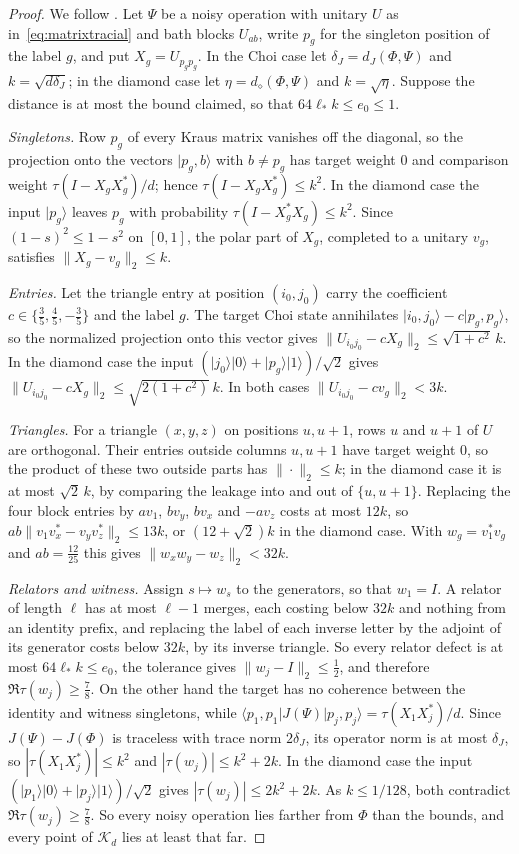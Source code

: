\documentclass[11pt]{article}
\newcommand{\K}{\mathcal K}
\newcommand{\ket}[1]{\lvert #1\rangle}
\newcommand{\bra}[1]{\langle #1\rvert}
\begin{document}
\begin{proof}
We follow \cite[Appendix~I]{MghirbiDouglasV1}.  Let $\Psi$ be a noisy operation with unitary $U$ as in~\eqref{eq:matrixtracial} and bath blocks $U_{ab}$, write $p_g$ for the singleton position of the label $g$, and put $X_g=U_{p_gp_g}$.  In the Choi case let $\delta_J=d_J(\Phi,\Psi)$ and $k=\sqrt{d\delta_J}$; in the diamond case let $\eta=d_\diamond(\Phi,\Psi)$ and $k=\sqrt\eta$.  Suppose the distance is at most the bound claimed, so that $64\ell_*k\le e_0\le1$.

\emph{Singletons.}  Row $p_g$ of every Kraus matrix vanishes off the diagonal, so the projection onto the vectors $\ket{p_g,b}$ with $b\ne p_g$ has target weight $0$ and comparison weight $\tau(I-X_gX_g^*)/d$; hence $\tau(I-X_gX_g^*)\le k^2$.  In the diamond case the input $\ket{p_g}$ leaves $p_g$ with probability $\tau(I-X_g^*X_g)\le k^2$.  Since $(1-s)^2\le1-s^2$ on $[0,1]$, the polar part of $X_g$, completed to a unitary $v_g$, satisfies $\|X_g-v_g\|_2\le k$.

\emph{Entries.}  Let the triangle entry at position $(i_0,j_0)$ carry the coefficient $c\in\{\frac35,\frac45,-\frac35\}$ and the label $g$.  The target Choi state annihilates $\ket{i_0,j_0}-c\ket{p_g,p_g}$, so the normalized projection onto this vector gives $\|U_{i_0j_0}-cX_g\|_2\le\sqrt{1+c^2}\,k$.  In the diamond case the input $(\ket{j_0}\ket0+\ket{p_g}\ket1)/\sqrt2$ gives $\|U_{i_0j_0}-cX_g\|_2\le\sqrt{2(1+c^2)}\,k$.  In both cases $\|U_{i_0j_0}-cv_g\|_2<3k$.

\emph{Triangles.}  For a triangle $(x,y,z)$ on positions $u,u+1$, rows $u$ and $u+1$ of $U$ are orthogonal.  Their entries outside columns $u,u+1$ have target weight $0$, so the product of these two outside parts has $\|\cdot\|_2\le k$; in the diamond case it is at most $\sqrt2\,k$, by comparing the leakage into and out of $\{u,u+1\}$.  Replacing the four block entries by $av_1$, $bv_y$, $bv_x$ and $-av_z$ costs at most $12k$, so $ab\|v_1v_x^*-v_yv_z^*\|_2\le13k$, or $(12+\sqrt2)k$ in the diamond case.  With $w_g=v_1^*v_g$ and $ab=\frac{12}{25}$ this gives $\|w_xw_y-w_z\|_2<32k$.

\emph{Relators and witness.}  Assign $s\mapsto w_s$ to the generators, so that $w_1=I$.  A relator of length $\ell$ has at most $\ell-1$ merges, each costing below $32k$ and nothing from an identity prefix, and replacing the label of each inverse letter by the adjoint of its generator costs below $32k$, by its inverse triangle.  So every relator defect is at most $64\ell_*k\le e_0$, the tolerance gives $\|w_j-I\|_2\le\frac12$, and therefore $\Re\tau(w_j)\ge\frac78$.  On the other hand the target has no coherence between the identity and witness singletons, while $\bra{p_1,p_1}J(\Psi)\ket{p_j,p_j}=\tau(X_1X_j^*)/d$.  Since $J(\Psi)-J(\Phi)$ is traceless with trace norm $2\delta_J$, its operator norm is at most $\delta_J$, so $|\tau(X_1X_j^*)|\le k^2$ and $|\tau(w_j)|\le k^2+2k$.  In the diamond case the input $(\ket{p_1}\ket0+\ket{p_j}\ket1)/\sqrt2$ gives $|\tau(w_j)|\le2k^2+2k$.  As $k\le1/128$, both contradict $\Re\tau(w_j)\ge\frac78$.  So every noisy operation lies farther from $\Phi$ than the bounds, and every point of $\K_d$ lies at least that far.
\end{proof}
\end{document}
